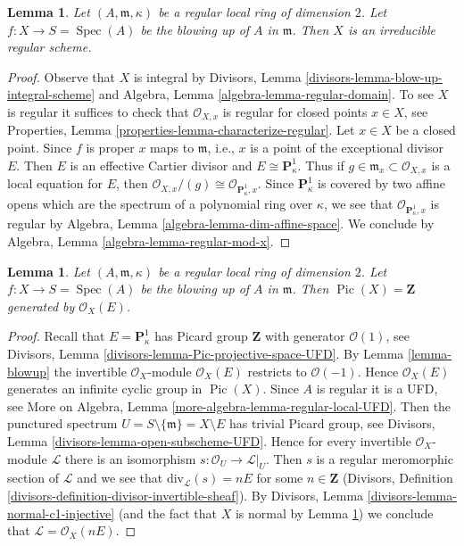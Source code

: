 \documentclass{stacks-project}
\theoremstyle{plain}
\newtheorem{lemma}[subsection]{Lemma}
\theoremstyle{definition}
\theoremstyle{remark}
\numberwithin{equation}{subsection}
\def\Spec{\mathop{\mathrm{Spec}}}
\def\Pic{\mathop{\mathrm{Pic}}\nolimits}
\begin{document}
\begin{lemma}
\label{lemma-blowup-regular}
Let $(A, \mathfrak m, \kappa)$ be a regular local ring of dimension $2$.
Let $f : X \to S = \Spec(A)$ be the blowing up of $A$ in $\mathfrak m$.
Then $X$ is an irreducible regular scheme.
\end{lemma}

\begin{proof}
Observe that $X$ is integral by
Divisors, Lemma \ref{divisors-lemma-blow-up-integral-scheme}
and
Algebra, Lemma \ref{algebra-lemma-regular-domain}.
To see $X$ is regular it suffices to check that $\mathcal{O}_{X, x}$
is regular for closed points $x \in X$, see
Properties, Lemma \ref{properties-lemma-characterize-regular}.
Let $x \in X$ be a closed point. Since $f$ is proper $x$ maps to
$\mathfrak m$, i.e., $x$ is a point of the exceptional divisor $E$.
Then $E$ is an effective Cartier divisor and $E \cong \mathbf{P}^1_\kappa$.
Thus if $g \in \mathfrak m_x \subset \mathcal{O}_{X, x}$ is a local
equation for $E$, then
$\mathcal{O}_{X, x}/(g) \cong \mathcal{O}_{\mathbf{P}^1_\kappa, x}$.
Since $\mathbf{P}^1_\kappa$ is covered by two affine opens which are the
spectrum of a polynomial ring over $\kappa$, we see that
$\mathcal{O}_{\mathbf{P}^1_\kappa, x}$ is regular by
Algebra, Lemma \ref{algebra-lemma-dim-affine-space}.
We conclude by
Algebra, Lemma \ref{algebra-lemma-regular-mod-x}.
\end{proof}

\begin{lemma}
\label{lemma-blowup-pic}
Let $(A, \mathfrak m, \kappa)$ be a regular local ring of dimension $2$.
Let $f : X \to S = \Spec(A)$ be the blowing up of $A$ in $\mathfrak m$.
Then $\Pic(X) = \mathbf{Z}$ generated by $\mathcal{O}_X(E)$.
\end{lemma}

\begin{proof}
Recall that $E = \mathbf{P}^1_\kappa$ has Picard group $\mathbf{Z}$
with generator $\mathcal{O}(1)$, see
Divisors, Lemma \ref{divisors-lemma-Pic-projective-space-UFD}.
By Lemma \ref{lemma-blowup} the invertible $\mathcal{O}_X$-module
$\mathcal{O}_X(E)$ restricts to $\mathcal{O}(-1)$. Hence
$\mathcal{O}_X(E)$ generates an infinite cyclic group in $\Pic(X)$.
Since $A$ is regular it is a UFD, see More on Algebra, 
Lemma \ref{more-algebra-lemma-regular-local-UFD}.
Then the punctured spectrum $U = S \setminus \{\mathfrak m\} = X \setminus E$
has trivial Picard group, see
Divisors, Lemma \ref{divisors-lemma-open-subscheme-UFD}.
Hence for every invertible $\mathcal{O}_X$-module $\mathcal{L}$
there is an isomorphism $s : \mathcal{O}_U \to \mathcal{L}|_U$.
Then $s$ is a regular meromorphic section of $\mathcal{L}$
and we see that $\text{div}_\mathcal{L}(s) = nE$ for some
$n \in \mathbf{Z}$
(Divisors, Definition \ref{divisors-definition-divisor-invertible-sheaf}).
By Divisors, Lemma \ref{divisors-lemma-normal-c1-injective}
(and the fact that $X$ is normal by Lemma \ref{lemma-blowup-regular})
we conclude that $\mathcal{L} = \mathcal{O}_X(nE)$.
\end{proof}
\end{document}
